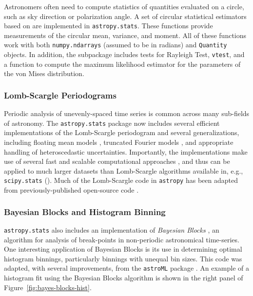 \documentclass[modern]{aastex61}
\newcommand{\package}[1]{\texttt{#1}\xspace}
\newcommand{\astropypkg}{\package{astropy}}
\renewcommand{\figurename}{Figure\xspace}
\begin{document}
Astronomers often need to compute statistics of quantities evaluated on a
circle, such as sky direction or polarization angle.
A set of circular statistical estimators based on \citet{JammalamadakaSengupta}
are implemented in \package{astropy.stats}.  These functions provide
measurements of the circular mean, variance, and moment.   All of these
functions work with both \texttt{numpy.ndarrays} (assumed to be in radians) and
\texttt{Quantity} objects.  In addition, the subpackage includes
tests for Rayleigh Test, \texttt{vtest}, and a function to compute the maximum
likelihood estimator for the parameters of the von Mises distribution.

\subsubsection{Lomb-Scargle Periodograms}

Periodic analysis of unevenly-spaced time series is common across many
sub-fields of astronomy. The \package{astropy.stats} package now includes
several efficient implementations of the Lomb-Scargle periodogram
\citep{Lomb76, Scargle82} and several generalizations, including floating mean
models \citep{Zechmeister09}, truncated Fourier models \citep{Bretthorst2003},
and appropriate handling of heteroscedastic uncertainties.
Importantly, the implementations make use of several fast and scalable
computational approaches \citep[e.g.,][]{Press89, Palmer09}, and thus can be
applied to much larger datasets than Lomb-Scargle algorithms available in,
e.g., \package{scipy.stats} (\citealt{scipy}). Much of the Lomb-Scargle code
in \astropypkg has been adapted from previously-published open-source code
\citep{astroML, VanderPlas2015}.

\subsubsection{Bayesian Blocks and Histogram Binning}
\package{astropy.stats} also includes an implementation of
{\it Bayesian Blocks} \citep{Scargle2013}, an algorithm for analysis of
break-points in non-periodic astronomical time-series. One interesting
application of Bayesian Blocks is its use in determining optimal histogram
binnings, particularly binnings with unequal bin sizes.
This code was adapted, with several improvements, from the \package{astroML}
package \citep{astroML}. An example of a histogram fit using the Bayesian
Blocks algorithm is shown in the right panel of
\figurename~\ref{fig:bayes-blocks-hist}.
\end{document}
